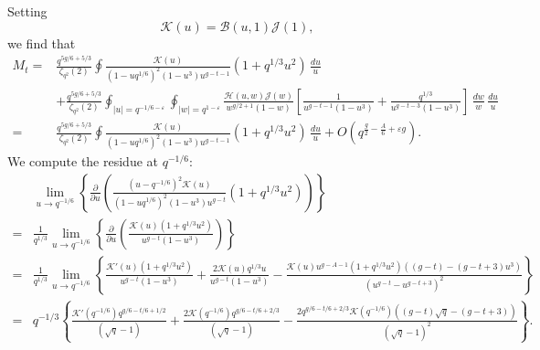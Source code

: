 \documentclass[table]{amsart}
\numberwithin{equation}{section}
\begin{document}
\par Setting
 \begin{equation}
 \mathcal{K}(u)= \mathcal{B}(u,1) \mathcal{J}(1),
 \end{equation}we find that
\begin{align*}
M_t =&\frac{q^{5g/6+5/3}}{\zeta_{q^2}(2)} \oint \frac{ \mathcal{K}(u)}{(1-uq^{1/6})^2(1-u^3) u^{g-t-1}} (1+ q^{1/3}u^2) \, \frac{du}{u}\\
&+ \frac{q^{5g/6+5/3}}{\zeta_{q^2}(2)} \oint_{|u|=q^{-1/6-\varepsilon}} \oint_{|w|=q^{1-\varepsilon}} \frac{\mathcal{H}(u,w) \mathcal{J}(w)}{w^{g/2+1}(1-w)} \left[ \frac{1}{u^{g-t-1} (1-u^3)} + \frac{ q^{1/3}}{u^{g-t-3}(1-u^3)} \right] \, \frac{dw}{w} \, \frac{du}{u}\\
=&\frac{q^{5g/6+5/3}}{\zeta_{q^2}(2)} \oint \frac{ \mathcal{K}(u)}{(1-uq^{1/6})^2(1-u^3) u^{g-t-1}} (1+ q^{1/3}u^2) \, \frac{du}{u}+O\left(q^{\frac{g}{2}-\frac{A}{6}+\varepsilon g}\right).
\end{align*}
\noindent We compute the residue at $q^{-1/6}$:
{\small\[\begin{split}& \lim_{u\rightarrow q^{-1/6}}\left\{\frac{\partial}{\partial u}\left(\frac{(u-q^{-1/6})^2 \mathcal{K}(u)}{(1-uq^{1/6})^2(1-u^3) u^{g-t}} (1+ q^{1/3}u^2)\right)\right\}\\ 
=& \frac{1}{q^{1/3}} \lim_{u\rightarrow q^{-1/6}}\left\{\frac{\partial}{\partial u}\left(\frac{\mathcal{K}(u)(1+q^{1/3}u^2)}{u^{g-t}(1-u^3)}\right)\right\} \\
= & \frac{1}{q^{1/3}} \lim_{u\rightarrow q^{-1/6}} \left\{ \frac{\mathcal{K}'(u)(1+q^{1/3} u^2)}{u^{g-t}(1-u^3)}+\frac{2\mathcal{K}(u) q^{1/3} u}{u^{g-t}(1-u^3)}-\frac{\mathcal{K}(u)u^{g-A-1}(1+q^{1/3}u^2)((g-t)-(g-t+3)u^3)}{(u^{g-t}-u^{g-t+3})^2}\right\}\\
=& q^{-1/3}\left\{ \frac{\mathcal{K}'(q^{-1/6}) q^{g/6-t/6+1/2}}{(\sqrt{q}-1)}+\frac{2\mathcal{K}(q^{-1/6})q^{g/6-t/6+2/3}}{(\sqrt{q}-1)}-\frac{2 q^{g/6-t/6+2/3}\mathcal{K}(q^{-1/6})\left((g-t)\sqrt{q}-(g-t+3)\right)}{(\sqrt{q}-1)^2}\right\}.
\end{split}\]}
\end{document}
